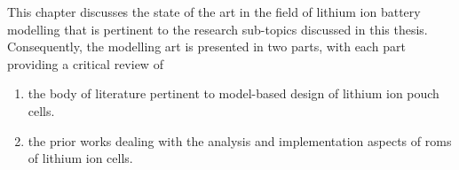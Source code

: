 
This chapter discusses the state of the  art in the field of lithium ion battery
modelling that is pertinent to the research sub-topics discussed in this thesis.
Consequently,  the modelling  art  is presented  in two  parts,  with each  part
providing a critical review of
\begin{enumerate}[topsep=0pt, before={\vspace*{-0.25\baselineskip}}]
    \item the body of literature pertinent to model-based design of lithium ion pouch cells.
    \item the prior works dealing with the analysis and implementation aspects of \glspl{rom} of lithium ion cells.
\end{enumerate}

